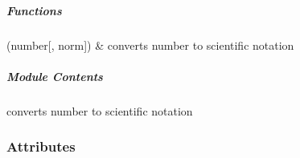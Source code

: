 \documentclass[letterpaper,10pt,english]{sphinxmanual}
\begin{document}
\subparagraph{Functions}
\label{\detokenize{autoapi/unduwave/unduwave_incl/index:functions}}

\begin{savenotes}\sphinxattablestart
\sphinxthistablewithglobalstyle
\sphinxthistablewithnovlinesstyle
\centering
\begin{tabulary}{\linewidth}[t]{}
\sphinxtoprule
\sphinxtableatstartofbodyhook
\sphinxAtStartPar
{\hyperref[\detokenize{autoapi/unduwave/unduwave_incl/index:unduwave.unduwave_incl.to_scn}]{}}(number{[}, norm{]})
&
\sphinxAtStartPar
converts number to scientific notation
\\
\sphinxbottomrule
\end{tabulary}
\sphinxtableafterendhook\par
\sphinxattableend\end{savenotes}


\subparagraph{Module Contents}
\label{\detokenize{autoapi/unduwave/unduwave_incl/index:module-contents}}

\begin{fulllineitems}
\label{\detokenize{autoapi/unduwave/unduwave_incl/index:unduwave.unduwave_incl.cm_inch}}
\pysigstartsignatures
{}
\pysigstopsignatures
\end{fulllineitems}


\begin{fulllineitems}
\label{\detokenize{autoapi/unduwave/unduwave_incl/index:unduwave.unduwave_incl.to_scn}}
\pysigstartsignatures
{}
\pysigstopsignatures
\sphinxAtStartPar
converts number to scientific notation

\end{fulllineitems}



\subsubsection{Attributes}
\label{\detokenize{autoapi/unduwave/index:attributes}}
\end{document}
